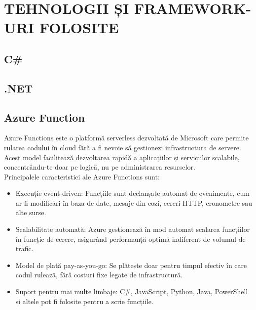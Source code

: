 \chapter{TEHNOLOGII ȘI FRAMEWORK-URI FOLOSITE}
\section{C\#}

\section{.NET}
\section{Azure Function}
 {\hspace*{1cm} Azure Functions este o platformă serverless dezvoltată de Microsoft care permite rularea codului în cloud fără a fi nevoie să gestionezi infrastructura de servere. Acest model facilitează dezvoltarea rapidă a aplicațiilor și serviciilor scalabile, concentrându-te doar pe logică, nu pe administrarea resurselor.}\parencite{azureFunctions}\\
{Principalele caracteristici ale Azure Functions sunt:}
\begin{itemize}
    \item Execuție event-driven: Funcțiile sunt declanșate automat de evenimente, cum ar fi modificări în baza de date, mesaje din cozi, cereri HTTP, cronometre sau alte surse.
    \item Scalabilitate automată: Azure gestionează în mod automat scalarea funcțiilor în funcție de cerere, asigurând performanță optimă indiferent de volumul de trafic.
    \item Model de plată pay-as-you-go: Se plătește doar pentru timpul efectiv în care codul rulează, fără costuri fixe legate de infrastructură.
    \item Suport pentru mai multe limbaje: C\#, JavaScript, Python, Java, PowerShell și altele pot fi folosite pentru a scrie funcțiile.
\end{itemize}\parencite{azureFunctions}

